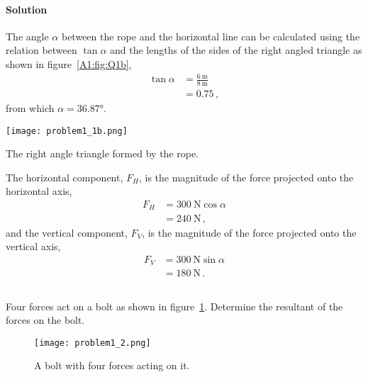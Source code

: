 \documentclass[a4paper,justified,oneside]{tufte-handout}
\numberwithin{equation}{subsection}
\begin{document}
\begin{solution}
\paragraph{Solution}
The angle $\alpha$ between the rope and the horizontal line can be calculated using the relation between $\tan\alpha$ and the lengths of the sides of the right angled triangle as shown in figure~\ref{A1:fig:Q1b},
\begin{align*}
	\tan\alpha	&=\frac{\SI{6}{\m}}{\SI{8}{\m}}\\
				&=0.75 \, ,	
\end{align*}
from which $\alpha=\ang{36.87}$.
\begin{marginfigure}
\centering
\texttt{[image: problem1\_1b.png]}
\caption{The right angle triangle formed by the rope.}
\label{A1:fig:Q1b}
\end{marginfigure}

The horizontal component, $F_H$, is the magnitude of the force projected onto the horizontal axis,
\begin{align*}
	F_H	&=\SI{300}{\N} \cos\alpha \\
		&= \SI{240}{\N} \,,
\end{align*} and the vertical component, $F_V$, is the magnitude of the force projected onto the vertical axis, 
\begin{align*}
	F_V	&=\SI{300}{\N} \sin\alpha \\
		&= \SI{180}{\N}\, .
\end{align*}
\clearpage
\end{solution}

\subsection{}
Four forces act on a bolt as shown in figure~\ref{A1:fig:Q2}. Determine the resultant of the forces on the bolt.
\begin{figure}
	\centering
	\texttt{[image: problem1\_2.png]}
	\caption{A bolt with four forces acting on it.}
	\label{A1:fig:Q2}
\end{figure}
\end{document}
